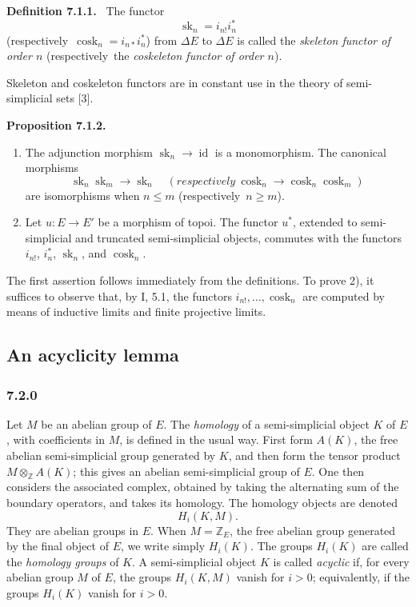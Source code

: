 \documentclass[11pt]{article}
\newcommand{\ZZ}{\mathbb Z}
\newcommand{\id}{\operatorname{id}}
\newcommand{\sk}{\operatorname{sk}}
\newcommand{\cosk}{\operatorname{cosk}}
\newcommand{\resp}{respectively}
\newenvironment{statement}[1]{\par\medskip\noindent\textbf{#1.}\ }{\par\medskip}
\begin{document}
\begin{statement}{Definition 7.1.1}
The functor
\[
        \sk_n=i_{n!}i_n^*
\]
(\resp\ $\cosk_n=i_{n*}i_n^*$) from $\Delta E$ to $\Delta E$ is called the \emph{skeleton functor of order $n$} (\resp\ the \emph{coskeleton functor of order $n$}).
\end{statement}

Skeleton and coskeleton functors are in constant use in the theory of semi-simplicial sets [3].

\begin{statement}{Proposition 7.1.2}
\begin{enumerate}[label=\arabic*)]
\item The adjunction morphism $\sk_n\to\id$ is a monomorphism. The canonical morphisms
\[
        \sk_n\sk_m\to\sk_n
        \quad(\resp\ \cosk_n\to\cosk_n\cosk_m)
\]
are isomorphisms when $n\leq m$ (\resp\ $n\geq m$).
\item Let $u:E\to E'$ be a morphism of topoi. The functor $u^*$, extended to semi-simplicial and truncated semi-simplicial objects, commutes with the functors $i_{n!}$, $i_n^*$, $\sk_n$, and $\cosk_n$.
\end{enumerate}
\end{statement}

The first assertion follows immediately from the definitions. To prove 2), it suffices to observe that, by I, 5.1, the functors $i_{n!},\ldots,\cosk_n$ are computed by means of inductive limits and finite projective limits.

\subsection{An acyclicity lemma}

\subsubsection*{7.2.0}
Let $M$ be an abelian group of $E$. The \emph{homology} of a semi-simplicial object $K$ of $E$, with coefficients in $M$, is defined in the usual way. First form $A(K)$, the free abelian semi-simplicial group generated by $K$, and then form the tensor product $M\otimes_{\ZZ}A(K)$; this gives an abelian semi-simplicial group of $E$. One then considers the associated complex, obtained by taking the alternating sum of the boundary operators, and takes its homology. The homology objects are denoted
\[
        H_i(K,M).
\]
They are abelian groups in $E$. When $M=\ZZ_E$, the free abelian group generated by the final object of $E$, we write simply $H_i(K)$. The groups $H_i(K)$ are called the \emph{homology groups} of $K$. A semi-simplicial object $K$ is called \emph{acyclic} if, for every abelian group $M$ of $E$, the groups $H_i(K,M)$ vanish for $i>0$; equivalently, if the groups $H_i(K)$ vanish for $i>0$.
\end{document}
